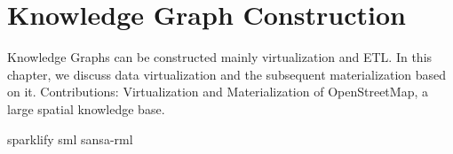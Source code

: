 
\chapter{Knowledge Graph Construction}
Knowledge Graphs can be constructed mainly virtualization and ETL.
In this chapter, we discuss data virtualization and the subsequent materialization based on it.
Contributions: Virtualization and Materialization of OpenStreetMap, a large spatial knowledge base.


{sparklify}
{sml}
{sansa-rml}

